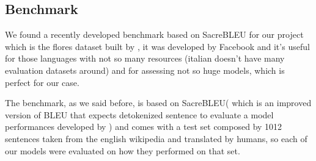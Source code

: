 \subsection{Benchmark}
We found a recently developed benchmark based on SacreBLEU for our project which is the flores dataset built by \cite{goyal2021flores}, it was developed by Facebook and it's useful for those languages with not so many resources (italian doesn't have many evaluation datasets around) and for assessing not so huge models, which is perfect for our case.
\vspace{3mm}

The benchmark, as we said before, is based on SacreBLEU( which is an improved version of BLEU that expects detokenized sentence to evaluate a model performances developed by \cite{post2018call}) and comes with a test set composed by 1012 sentences taken from the english wikipedia and translated by humans, so each of our models were evaluated on how they performed on that set.
